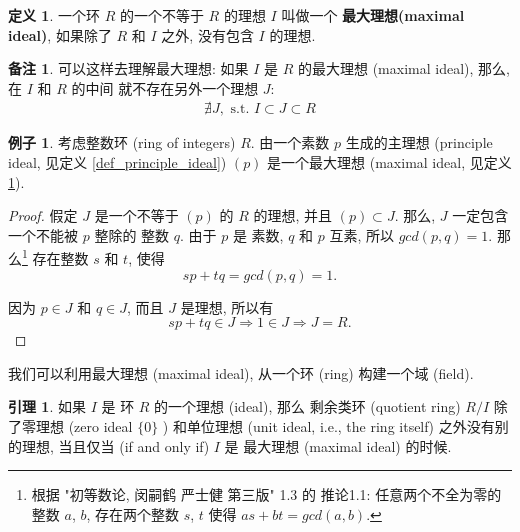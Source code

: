 \documentclass[utf8]{ctexbook}
\theoremstyle{definition}
\newtheorem{protodefinition}{定义}[section]
\newenvironment{definition}
   {\colorlet{shadecolor}{black!15}\begin{shaded}\begin{protodefinition}}
   {\end{protodefinition}\end{shaded}}
\newtheorem{memo}{备注}[section]
\newtheorem{example}{例子}[section]
\newtheorem{lemma}{引理}[section]
\begin{document}
\begin{definition}\label{def_maximal_ideal}
一个环 $R$ 的一个不等于 $R$ 的理想 $I$ 叫做一个 \textbf{最大理想(maximal ideal)}, 如果除了 $R$ 和 $I$ 之外, 没有包含 $I$ 的理想.
\end{definition}

\begin{memo}\label{memo_maximal_ideal}
可以这样去理解最大理想: 如果 $I$ 是 $R$ 的最大理想 (maximal ideal), 那么, 在 $I$ 和 $R$ 的中间 就不存在另外一个理想 $J$: 
\begin{align*}
\nexists J, \mbox{ s.t. } I \subset J \subset R
\end{align*}
\end{memo}

\begin{example}\label{example_prime_number_max_ideal}
考虑整数环 (ring of integers) $R$. 由一个素数 $p$ 生成的主理想 (principle ideal, 见定义 \ref{def_principle_ideal}) $(p)$ 是一个最大理想 (maximal ideal, 见定义 \ref{def_maximal_ideal}). 

\end{example}

\begin{proof}
假定 $J$ 是一个不等于 $(p)$ 的 $R$ 的理想, 并且 $(p) \subset J$. 那么, $J$ 一定包含一个不能被 $p$ 整除的 整数 $q$. 由于 $p$ 是 素数, $q$ 和 $p$ 互素, 所以 $gcd(p, q) = 1$. 那么\footnote{根据 "初等数论, 闵嗣鹤 严士健 第三版" 1.3 的 推论1.1: 任意两个不全为零的整数 $a$, $b$, 存在两个整数 $s$, $t$ 使得 $as + bt = gcd(a,b)$. } 存在整数 $s$ 和 $t$, 使得
\begin{equation}
 s p + t q = gcd(p, q) =  1 . \nonumber
\end{equation} 

因为 $p \in J$ 和 $q \in J$, 而且 $J$ 是理想, 所以有
\begin{equation}
s p + t q \in J \Longrightarrow 1 \in J \Longrightarrow J = R . \nonumber
\end{equation} 

\end{proof}

我们可以利用最大理想 (maximal ideal), 从一个环 (ring) 构建一个域 (field).


\begin{lemma}\label{lemma_max_ideal_quotient_ring}
如果 $I$ 是 环 $R$ 的一个理想 (ideal), 那么 剩余类环 (quotient ring) $R/I$ 除了零理想 (zero ideal $\{ 0 \}$ ) 和单位理想 (unit ideal, i.e., the ring itself) 之外没有别的理想, 当且仅当 (if and only if) $I$ 是 最大理想 (maximal ideal) 的时候.
\end{lemma}
\end{document}
